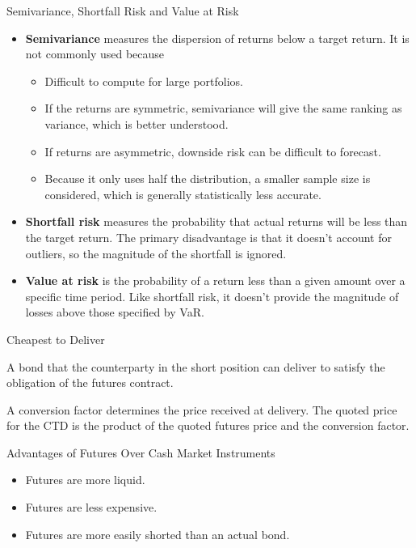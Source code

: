 \documentclass[../custom]{flashcards}
\begin{document}
\begin{flashcard}{Semivariance, Shortfall Risk and Value at Risk}
    \begin{itemize}
        \item \textbf{Semivariance} measures the dispersion of returns below a target return. It is not commonly used because
            \begin{itemize}
                \item Difficult to compute for large portfolios.
                \item If the returns are symmetric, semivariance will give the same ranking as variance, which is better understood.
                \item If returns are asymmetric, downside risk can be difficult to forecast.
                \item Because it only uses half the distribution, a smaller sample size is considered, which is generally statistically less accurate.
            \end{itemize}
        \item \textbf{Shortfall risk} measures the probability that actual returns will be less than the target return. The primary disadvantage is that it doesn't account for outliers, so the magnitude of the shortfall is ignored.
        \item \textbf{Value at risk} is the probability of a return less than a given amount over a specific time period. Like shortfall risk, it doesn't provide the magnitude of losses above those specified by VaR.
    \end{itemize}
\end{flashcard}

\begin{flashcard}{Cheapest to Deliver}
    \begin{flushleft}
        A bond that the counterparty in the short position can deliver to satisfy the obligation of the futures contract.\newline

        A conversion factor determines the price received at delivery. The quoted price for the CTD is the product of the quoted futures price and the conversion factor.
    \end{flushleft}
\end{flashcard}

\begin{flashcard}{Advantages of Futures Over Cash Market Instruments}
    \begin{itemize}
        \item Futures are more liquid.
        \item Futures are less expensive.
        \item Futures are more easily shorted than an actual bond.
    \end{itemize}
\end{flashcard}
\end{document}

